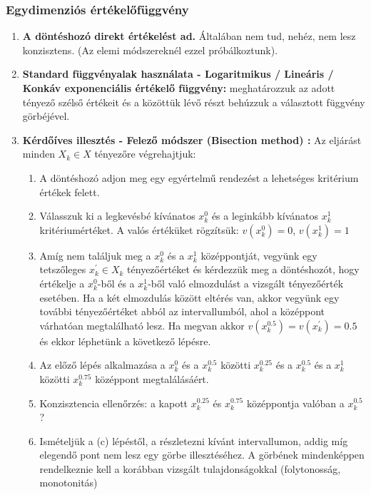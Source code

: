 \documentclass[a4paper,12pt]{article}
\begin{document}
\subsubsection{Egydimenziós értékelőfüggvény}
\label{sssec:1D}
\begin{enumerate}

\item \textbf{A döntéshozó direkt értékelést ad.} Általában nem tud, nehéz, nem lesz konzisztens. (Az elemi módszereknél ezzel próbálkoztunk).

\item \textbf{Standard függvényalak használata - Logaritmikus / Lineáris / Konkáv exponenciális értékelő függvény:}
meghatározzuk az adott tényező szélső értékeit és a közöttük lévő részt behúzzuk a választott függvény görbéjével.

\item \textbf{Kérdőíves illesztés - Felező módszer (Bisection method) :}
Az eljárást minden $X_k \in X$ tényezőre végrehajtjuk:
\begin{enumerate}
\item A döntéshozó adjon meg egy egyértelmű rendezést a lehetséges kritérium értékek felett.
\item Válasszuk ki a legkevésbé kívánatos $x^0_k $ és a leginkább kívánatos $x^1_k$ kritériumértéket.
A valós értéküket rögzítsük: $v(x^0_k) = 0 $, $v(x^1_k) = 1$
\item Amíg nem találjuk meg a $x^0_k$ és a $x^1_k$ középpontját,
vegyünk egy tetszőleges $x^\prime_k \in X_k$ tényezőértéket és kérdezzük meg a döntéshozót,
hogy értékelje a $x^0_k$-ből és a $x^1_k$-ből való elmozdulást a vizsgált tényezőérték esetében.
Ha a két elmozdulás között eltérés van, akkor vegyünk egy további tényezőértéket abból az intervallumból,
ahol a középpont várhatóan megtalálható lesz.
Ha megvan akkor $ v(x^{0.5}_k) = v(x^{\prime}_k) = 0.5$ és ekkor léphetünk a következő lépésre.
\item Az előző lépés alkalmazása a $x^0_k$ és a $x^{0.5}_k$ közötti $x^{0.25}_k$ és a $x^{0.5}_k$ és a $x^1_k$ közötti $x^{0.75}_k$ középpont megtalálásáért.
\item Konzisztencia ellenőrzés: a kapott $x^{0.25}_k$ és $x^{0.75}_k$ középpontja valóban a $x^{0.5}_k$?
\item Ismételjük a (c) lépéstől, a részletezni kívánt intervallumon, addig míg elegendő pont nem lesz egy görbe illesztéséhez.
A görbének mindenképpen rendelkeznie kell a korábban vizsgált tulajdonságokkal (folytonosság, monotonitás)
\end{enumerate}

\end{enumerate}
\end{document}
